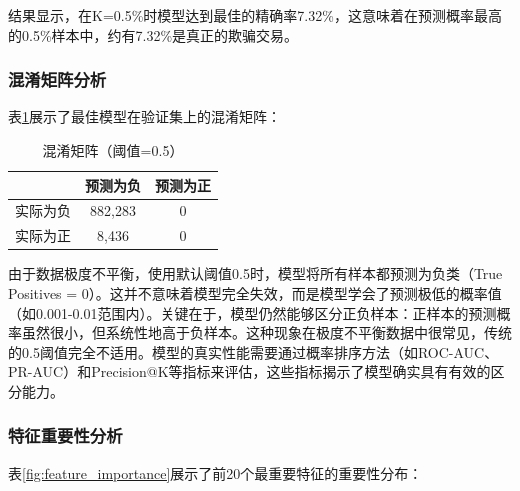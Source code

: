 \documentclass[12pt,a4paper]{article}
\begin{document}
结果显示，在K=0.5\%时模型达到最佳的精确率7.32\%，这意味着在预测概率最高的0.5\%样本中，约有7.32\%是真正的欺骗交易。

\subsubsection{混淆矩阵分析}

表\ref{tab:confusion_matrix}展示了最佳模型在验证集上的混淆矩阵：

\begin{table}[H]
\centering
\caption{混淆矩阵（阈值=0.5）}
\label{tab:confusion_matrix}
\begin{tabular}{lcc}
\toprule
 & 预测为负 & 预测为正 \\
\midrule
实际为负 & 882,283 & 0 \\
实际为正 & 8,436 & 0 \\
\bottomrule
\end{tabular}
\end{table}

由于数据极度不平衡，使用默认阈值0.5时，模型将所有样本都预测为负类（True Positives = 0）。这并不意味着模型完全失效，而是模型学会了预测极低的概率值（如0.001-0.01范围内）。关键在于，模型仍然能够区分正负样本：正样本的预测概率虽然很小，但系统性地高于负样本。这种现象在极度不平衡数据中很常见，传统的0.5阈值完全不适用。模型的真实性能需要通过概率排序方法（如ROC-AUC、PR-AUC）和Precision@K等指标来评估，这些指标揭示了模型确实具有有效的区分能力。

\subsubsection{特征重要性分析}

表\ref{fig:feature_importance}展示了前20个最重要特征的重要性分布：
\end{document}
